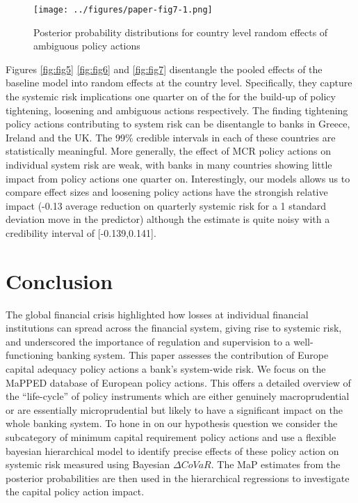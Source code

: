 \documentclass[
  10pt,
]{article}
\begin{document}
\begin{figure}
\centering
\texttt{[image: ../figures/paper-fig7-1.png]}
\caption{Posterior probability distributions for country level random
effects of ambiguous policy actions}
\end{figure}

Figures \ref{fig:fig5} \ref{fig:fig6} and \ref{fig:fig7} disentangle the
pooled effects of the baseline model into random effects at the country
level. Specifically, they capture the systemic risk implications one
quarter on of the for the build-up of policy tightening, loosening and
ambiguous actions respectively. The finding tightening policy actions
contributing to system risk can be disentangle to banks in Greece,
Ireland and the UK. The 99\% credible intervals in each of these
countries are statistically meaningful. More generally, the effect of
MCR policy actions on individual system risk are weak, with banks in
many countries showing little impact from policy actions one quarter on.
Interestingly, our models allows us to compare effect sizes and
loosening policy actions have the strongish relative impact (-0.13
average reduction on quarterly systemic risk for a 1 standard deviation
move in the predictor) although the estimate is quite noisy with a
credibility interval of {[}-0.139,0.141{]}.

\hypertarget{conclusion}{%
\section{Conclusion}\label{conclusion}}

The global financial crisis highlighted how losses at individual
financial institutions can spread across the financial system, giving
rise to systemic risk, and underscored the importance of regulation and
supervision to a well-functioning banking system. This paper assesses
the contribution of Europe capital adequacy policy actions a bank's
system-wide risk. We focus on the MaPPED database of European policy
actions. This offers a detailed overview of the ``life-cycle'' of policy
instruments which are either genuinely macroprudential or are
essentially microprudential but likely to have a significant impact on
the whole banking system. To hone in on our hypothesis question we
consider the subcategory of minimum capital requirement policy actions
and use a flexible bayesian hierarchical model to identify precise
effects of these policy action on systemic risk measured using Bayesian
\(\Delta CoVaR\). The MaP estimates from the posterior probabilities are
then used in the hierarchical regressions to investigate the capital
policy action impact.
\end{document}
